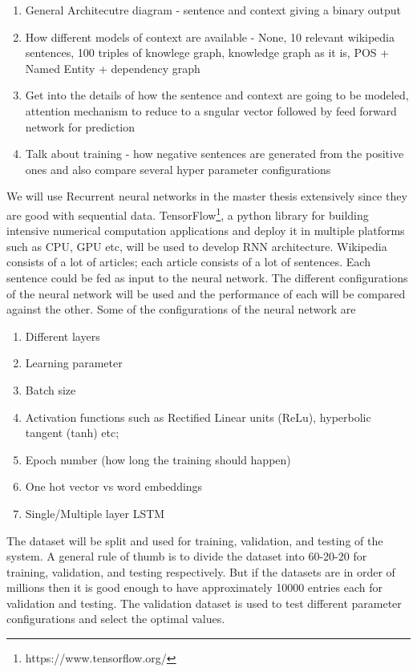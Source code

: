 \documentclass[a4paper, 11pt]{article}
\begin{document}
\begin{enumerate}

\item General Architecutre diagram - sentence and context giving a binary output
\item How different models of context are available - None, 10 relevant wikipedia sentences, 100 triples of knowlege graph, knowledge graph as it is, POS + Named Entity + dependency graph
\item Get into the details of how the sentence and context are going to be modeled, attention mechanism to reduce to a sngular vector followed by feed forward network for prediction
\item Talk about training - how negative sentences are generated from the positive ones and also compare several hyper parameter configurations
\end{enumerate}

We will use  Recurrent neural networks in the master thesis extensively since they are good with sequential data. TensorFlow\footnote{https://www.tensorflow.org/}, a python library for building intensive numerical computation applications and deploy it in multiple platforms such as CPU, GPU etc, will be used to develop RNN architecture. Wikipedia consists of a lot of articles; each article consists of a lot of sentences. Each sentence could be fed as input to the neural network. The different configurations of the neural network will be used and the performance of each will be compared against the other. Some of the configurations of the neural network are

\begin{enumerate}
\item Different layers
\item Learning parameter 
\item Batch size 
\item Activation functions such as Rectified Linear units (ReLu), hyperbolic tangent (tanh) etc; 
\item Epoch number (how long the training should happen)
\item One hot vector vs word embeddings
\item Single/Multiple layer LSTM
\end{enumerate}

The dataset will be split and used for training, validation, and testing of the system. A general rule of thumb is to divide the dataset into 60-20-20 for training, validation, and testing respectively. But if the datasets are in order of millions then it is good enough to have approximately 10000 entries each for validation and testing. The validation dataset is used to test different parameter configurations and select the optimal values.
\end{document}
